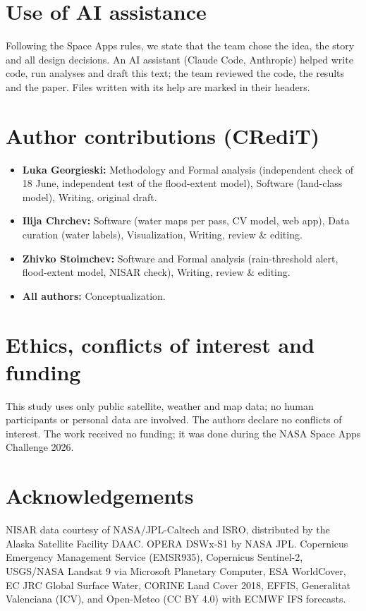 \documentclass[10pt,twocolumn]{article}
\begin{document}
\section*{Use of AI assistance}
Following the Space Apps rules, we state that the team chose the idea, the story and all design decisions. An AI assistant (Claude Code, Anthropic) helped write code, run analyses and draft this text; the team reviewed the code, the results and the paper. Files written with its help are marked in their headers.

\section*{Author contributions (CRediT)}
\begin{itemize}
\item{} \textbf{Luka Georgieski:} Methodology and Formal analysis (independent check of 18 June, independent test of the flood-extent model), Software (land-class model), Writing, original draft.
\item{} \textbf{Ilija Chrchev:} Software (water maps per pass, CV model, web app), Data curation (water labels), Visualization, Writing, review \& editing.
\item{} \textbf{Zhivko Stoimchev:} Software and Formal analysis (rain-threshold alert, flood-extent model, NISAR check), Writing, review \& editing.
\item{} \textbf{All authors:} Conceptualization.
\end{itemize}
\section*{Ethics, conflicts of interest and funding}
This study uses only public satellite, weather and map data; no human participants or personal data are involved. The authors declare no conflicts of interest. The work received no funding; it was done during the NASA Space Apps Challenge 2026.

\section*{Acknowledgements}
NISAR data courtesy of NASA/JPL-Caltech and ISRO, distributed by the Alaska Satellite Facility DAAC. OPERA DSWx-S1 by NASA JPL. Copernicus Emergency Management Service (EMSR935), Copernicus Sentinel-2, USGS/NASA Landsat 9 via Microsoft Planetary Computer, ESA WorldCover, EC JRC Global Surface Water, CORINE Land Cover 2018, EFFIS, Generalitat Valenciana (ICV), and Open-Meteo (CC BY 4.0) with ECMWF IFS forecasts.
\end{document}

